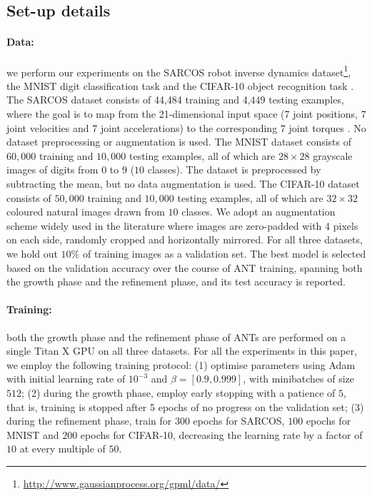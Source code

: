 \subsection{Set-up details}

\paragraph{Data:} we perform our experiments on the SARCOS robot inverse dynamics dataset\footnote{\url{http://www.gaussianprocess.org/gpml/data/}}, the MNIST digit classification task \cite{lecun1998gradient} and the CIFAR-10 object recognition task \cite{krizhevsky2009learning}. The SARCOS dataset consists of 44,484 training and 4,449 testing examples, where the goal is to map from the 21-dimensional input space (7 joint positions, 7 joint velocities and 7 joint accelerations) to the corresponding 7 joint torques \cite{vijayakumar2000locally}. No dataset preprocessing or augmentation is used. The MNIST dataset consists of $60,000$ training and $10,000$ testing examples, all of which are $28\times28$ grayscale images of digits from $0$ to $9$ ($10$ classes). The dataset is preprocessed by subtracting the mean, but no data augmentation is used. The CIFAR-10 dataset consists of $50,000$ training and $10,000$ testing examples, all of which are $32\times32$ coloured natural images drawn from $10$ classes. We adopt an augmentation scheme widely used in the literature \cite{goodfellow2013maxout,lin2013network,springenberg2014striving,he2016deep,huang2017densely} where images are zero-padded with 4 pixels on each side, randomly cropped and horizontally mirrored. For all three datasets, we hold out $10\%$ of training images as a validation set. The best model is selected based on the validation accuracy over the course of ANT training, spanning both the growth phase and the refinement phase, and its test accuracy is reported. 

\paragraph{Training:} both the growth phase and the refinement phase of ANTs are performed on a single Titan X GPU on all three datasets. For all the experiments in this paper, we employ the following training protocol: (1) optimise parameters using Adam \cite{kingma2014adam} with initial learning rate of $10^{-3}$ and $\beta = [0.9, 0.999]$, with minibatches of size $512$; (2) during the growth phase, employ early stopping with a patience of $5$, that is, training is stopped after 5 epochs of no progress on the validation set; (3) during the refinement phase, train for $300$ epochs for SARCOS, $100$ epochs for MNIST and $200$ epochs for CIFAR-10, decreasing the learning rate by a factor of $10$ at every multiple of $50$.

